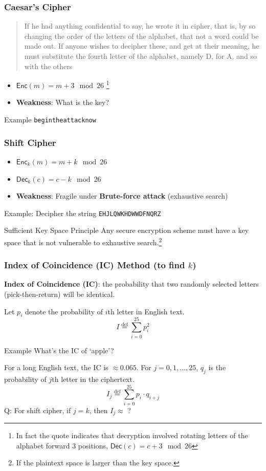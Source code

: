 \begin{frame}[fragile]\frametitle{Caesar's Cipher}
\begin{quote}
If he had anything confidential to say, he wrote it in cipher, that is, by so changing the order of the letters of the alphabet, that not a word could be made out. If anyone wishes to \alert{decipher} these, and get at their meaning, he must \alert{substitute the fourth letter of the alphabet, namely D, for A}, and so with the others

\end{quote}
\begin{itemize}
	\item $\mathsf{Enc}(m)=m+3\mod 26$ \footnote{In fact the quote indicates that decryption involved rotating letters of the alphabet forward 3 positions, $\mathsf{Dec}(c)=c+3\mod 26$}
	\item \textbf{Weakness}: \alert{What is the key?}
\end{itemize}
\begin{exampleblock}{Example}
\verb|begintheattacknow|
\end{exampleblock}
\end{frame}
\begin{frame}[fragile]\frametitle{Shift Cipher}
\begin{itemize}
\item $\mathsf{Enc}_k(m)=m+k\mod 26$
\item $\mathsf{Dec}_k(c)=c-k\mod 26$
\item \textbf{Weakness}: Fragile under \textbf{Brute-force attack} (exhaustive search)
\end{itemize}
\begin{exampleblock}{Example: Decipher the string}	
\verb|EHJLQWKHDWWDFNQRZ|
\end{exampleblock}
\begin{alertblock}{Sufficient Key Space Principle}
Any secure encryption scheme must have a key space that is not vulnerable to exhaustive search.\footnote{If the plaintext space is larger than the key space.}
\end{alertblock}
\end{frame}
\begin{frame}\frametitle{Index of Coincidence (IC) Method (to find $k$)}
\textbf{Index of Coincidence (IC)}: the probability that two randomly selected letters (pick-then-return) will be identical.

Let $p_i$ denote the probability of $i$th letter in English text.
\[I \overset{\text{def}}{=}\sum_{i=0}^{25} p_i^2 \]
\begin{exampleblock}{Example}
What's the IC of `apple'?
\end{exampleblock}

For a long English text, the IC is $\approx 0.065$.
For $j = 0, 1, \dotsc , 25$, $q_j$ is the probability of $j$th letter in the ciphertext.
\[I_j \overset{\text{def}}{=}\sum_{i=0}^{25} p_i \cdot q_{i+j}\]
\alert{Q: For shift cipher, if $j = k$, then $I_j \approx$ ?}

\end{frame}
